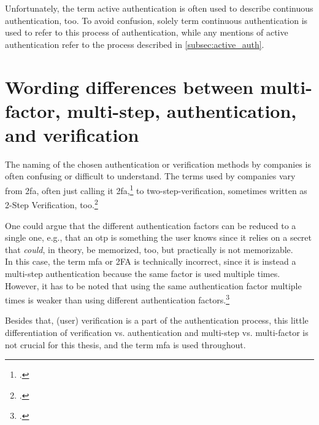 Unfortunately, the term active authentication is often used to describe continuous authentication, too. To avoid confusion, solely term continuous authentication is used to refer to this process of authentication, while any mentions of active authentication refer to the process described in \autoref{subsec:active_auth}.

\section{Wording differences between multi-factor, multi-step, authentication, and verification}

The naming of the chosen authentication or verification methods by companies is often confusing or difficult to understand. The terms used by companies vary from \gls{2fa}, often just calling it \gls{2fa},\footcite[See][]{apple_2fa} to two-step-verification, sometimes written as 2-Step Verification, too.\footcites[See][]{apple_s2v}[See][]{playstation}[See][]{google_2-step_verification}[See][]{microsoft_2sv}

One could argue that the different authentication factors can be reduced to a single one, e.g., that an \gls{otp} is \frqq something the user knows\flqq{} since it relies on a secret that \textit{could}, in theory, be memorized, too, but practically is not memorizable.\\
In this case, the term \gls{mfa} or 2FA is technically incorrect, since it is instead a multi-step authentication because the same factor is used multiple times. However, it has to be noted that using the same authentication factor multiple times is weaker than using different authentication factors.\footcite[See][117]{grimes2017hacking}

Besides that, (user) verification is a part of the authentication process, this little differentiation of verification vs. authentication and multi-step vs. multi-factor is not crucial for this thesis, and the term \gls{mfa} is used throughout.

%
%
%


